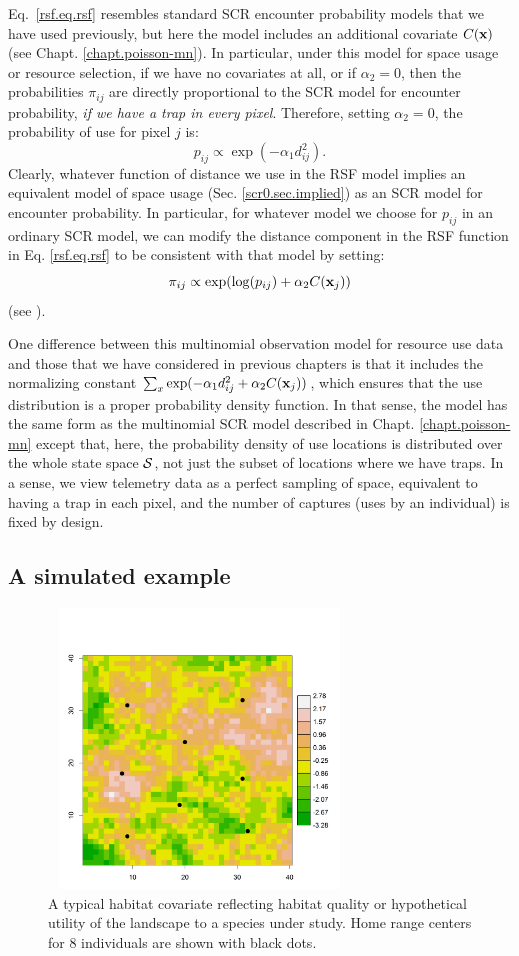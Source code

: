 Eq.~\ref{rsf.eq.rsf} resembles standard SCR encounter probability
models that we have used previously, but here the model includes an additional
covariate $C({\bf x})$ (see Chapt. \ref{chapt.poisson-mn}).  In
particular, under this model for space usage or resource selection, if
we have no covariates at all, or if $\alpha_{2} = 0$, then the
probabilities $\pi_{ij}$ are directly proportional to the SCR model
for encounter probability, {\it if we have a trap in every pixel}.  Therefore, setting $\alpha_{2} = 0$,
the probability of use for pixel $j$ is:
\[
p_{ij} \propto  \exp( -\alpha_{1} d_{ij}^{2}).
\]
Clearly, whatever function of distance we use in the RSF model implies
an equivalent model of space usage (Sec. \ref{scr0.sec.implied}) as an
SCR model for encounter probability.  In particular, for whatever
model we choose for $p_{ij}$ in an ordinary SCR model, we can modify
the distance component in the RSF function in Eq. \ref{rsf.eq.rsf}
to be consistent with that model by setting:
\[
\pi_{ij} \propto \exp( \log(p_{ij}) + \alpha_{2} C({\bf x}_{j}) )
\]
(see \citet{forester_etal:2009}).

One difference between this multinomial observation model for resource
use data and those that we have considered in previous chapters is
that it includes the normalizing constant $\sum_{x} \exp(-\alpha_{1}
d_{ij}^{2} +\alpha_{2} C({\bf x}_{j}))$, which ensures that the use
distribution is a proper probability density function. In that sense,
the model has the same form as the multinomial SCR model described in
Chapt. \ref{chapt.poisson-mn} except that, here, the probability
density of use locations is distributed over the whole state space
${\cal S}$, not just the subset of locations where we have traps. In a
sense, we view telemetry data as a perfect sampling of space,
equivalent to having a trap in each pixel, and the number of captures
(uses by an individual) is fixed by design.

\subsection{A simulated example}

\begin{figure}[ht]
\centering
\includegraphics[width=3.15in,height=2.93in]{Ch13-RSF/figs/habitat.png}
\caption{A typical habitat covariate reflecting habitat quality or
  hypothetical utility of the landscape to a species under study. Home
  range centers for 8 individuals are shown with black dots.}
\label{rsf.fig.habitat}
\end{figure}

